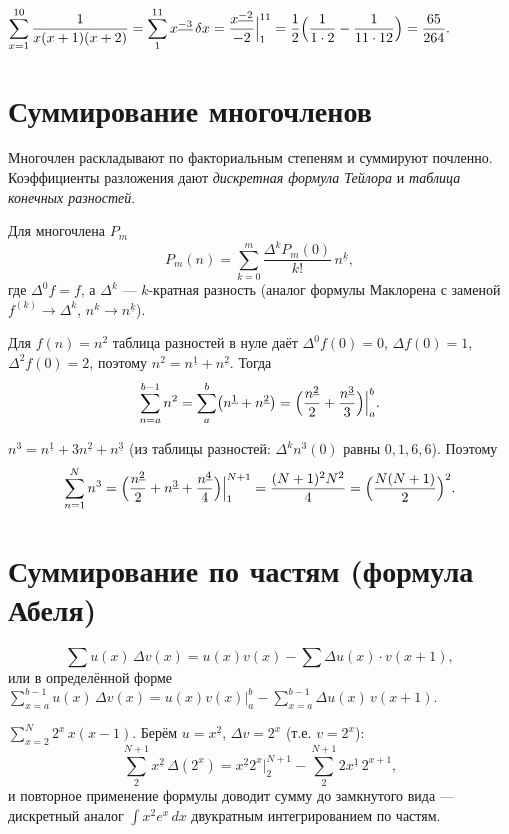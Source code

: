 \begin{example}
$\displaystyle\sum_{x=1}^{10}\frac{1}{x(x+1)(x+2)}=\sum_{1}^{11}x^{\underline{-3}}\,\delta x
=\frac{x^{\underline{-2}}}{-2}\Big|_1^{11}
=\frac12\Bigl(\frac{1}{1\cdot2}-\frac{1}{11\cdot12}\Bigr)=\frac{65}{264}.$
\end{example}

\section{Суммирование многочленов}

Многочлен раскладывают по факториальным степеням и суммируют почленно. Коэффициенты разложения
дают \emph{дискретная формула Тейлора} и \emph{таблица конечных разностей}.

\begin{theorem}
Для многочлена $P_m$
\[
  P_m(n)=\sum_{k=0}^{m}\frac{\Delta^k P_m(0)}{k!}\,n^{\underline k},
\]
где $\Delta^0 f=f$, а $\Delta^k$ — $k$-кратная разность (аналог формулы Маклорена с заменой
$f^{(k)}\to\Delta^k$, $n^k\to n^{\underline k}$).
\end{theorem}

\begin{example}
Для $f(n)=n^2$ таблица разностей в нуле даёт $\Delta^0 f(0)=0$, $\Delta f(0)=1$,
$\Delta^2 f(0)=2$, поэтому $n^2=n^{\underline1}+n^{\underline2}$. Тогда
\[
  \sum_{n=a}^{b-1}n^2=\sum_a^b\bigl(n^{\underline1}+n^{\underline2}\bigr)
   =\Bigl(\frac{n^{\underline2}}{2}+\frac{n^{\underline3}}{3}\Bigr)\Big|_a^b .
\]
\end{example}

\begin{example}
$n^3=n^{\underline1}+3n^{\underline2}+n^{\underline3}$ (из таблицы разностей: $\Delta^k n^3(0)$
равны $0,1,6,6$). Поэтому
\[
  \sum_{n=1}^{N}n^3=\Bigl(\frac{n^{\underline2}}{2}+n^{\underline3}+\frac{n^{\underline4}}{4}\Bigr)
   \Big|_1^{N+1}=\frac{(N+1)^2 N^2}{4}=\Bigl(\frac{N(N+1)}{2}\Bigr)^2 .
\]
\end{example}

\section{Суммирование по частям (формула Абеля)}

\begin{theorem}
\[
  \sum u(x)\,\Delta v(x)=u(x)v(x)-\sum \Delta u(x)\cdot v(x+1),
\]
или в определённой форме
$\displaystyle\sum_{x=a}^{b-1}u(x)\,\Delta v(x)=u(x)v(x)\Big|_a^b-\sum_{x=a}^{b-1}\Delta u(x)\,
v(x+1)$.
\end{theorem}

\begin{example}
$\displaystyle\sum_{x=2}^{N}2^{x}\,x(x-1)$. Берём $u=x^{\underline2}$, $\Delta v=2^x$ (т.е.
$v=2^x$):
\[
  \sum_{2}^{N+1}x^{\underline2}\,\Delta(2^x)=x^{\underline2}2^{x}\Big|_2^{N+1}
   -\sum_{2}^{N+1}2x^{\underline1}\,2^{x+1},
\]
и повторное применение формулы доводит сумму до замкнутого вида — дискретный аналог
$\int x^2 e^x\,dx$ двукратным интегрированием по частям.
\end{example}
